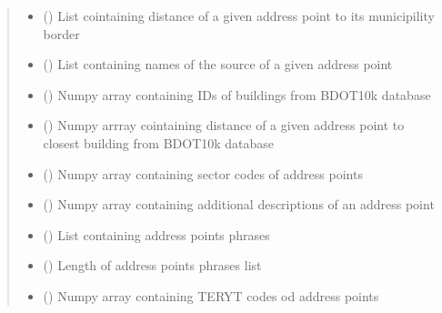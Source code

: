 \documentclass[letterpaper,10pt,english]{sphinxmanual}
\begin{document}
\begin{fulllineitems}
\begin{quote}
\begin{description}
\begin{itemize}
\item {} 
\sphinxAtStartPar
{} (\sphinxcode{\sphinxupquote{List}}{[}\sphinxcode{\sphinxupquote{float}}{]}) \textendash{} List cointaining distance of a given address point to its municipility border

\item {} 
\sphinxAtStartPar
{} (\sphinxcode{\sphinxupquote{List}}{[}\sphinxcode{\sphinxupquote{str}}{]}) \textendash{} List containing names of the source of a given address point

\item {} 
\sphinxAtStartPar
{} () \textendash{} Numpy array containing IDs of buildings from BDOT10k database

\item {} 
\sphinxAtStartPar
{} () \textendash{} Numpy arrray cointaining distance of a given address point to closest building from BDOT10k
database

\item {} 
\sphinxAtStartPar
{} () \textendash{} Numpy array containing sector codes of address points

\item {} 
\sphinxAtStartPar
{} () \textendash{} Numpy array containing additional descriptions of an address point

\item {} 
\sphinxAtStartPar
{} (\sphinxcode{\sphinxupquote{List}}{[}\sphinxcode{\sphinxupquote{str}}{]}) \textendash{} List containing address points phrases

\item {} 
\sphinxAtStartPar
{} () \textendash{} Length of address points phrases list

\item {} 
\sphinxAtStartPar
{} () \textendash{} Numpy array containing TERYT codes od address points


\end{itemize}
\end{description}
\end{quote}
\end{fulllineitems}
\end{document}
